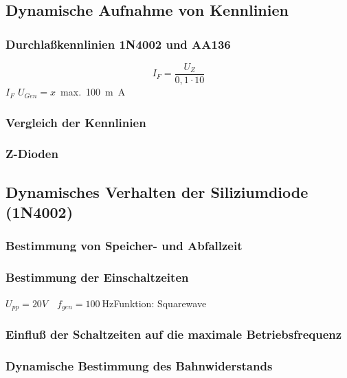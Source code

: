 \documentclass[
	a4paper, %
	12pt, %
]{CSUniSchoolLabReport}
\newcommand{\milli}{m}
\begin{document}

\subsection{Dynamische Aufnahme von Kennlinien}
\subsubsection{Durchlaßkennlinien 1N4002 und AA136}
\[
I_F = \frac{U_Z}{0,1 \cdot 10}
\]
$I_{F}$ 
$U_{Gen}= x$\ max.\ \SI{100}{\milli\ampere}

\subsubsection{Vergleich der Kennlinien}

\subsubsection{Z-Dioden}

\subsection{Dynamisches Verhalten der Siliziumdiode (1N4002)}
\subsubsection{Bestimmung von Speicher- und Abfallzeit}
\subsubsection{Bestimmung der Einschaltzeiten}
$U_{pp} = 20V \quad f_{gen} = \SI{100}{\hertz}$\quad Funktion: Squarewave

\subsubsection{Einfluß der Schaltzeiten auf die maximale Betriebsfrequenz}
\subsubsection{Dynamische Bestimmung des Bahnwiderstands}
\end{document}
